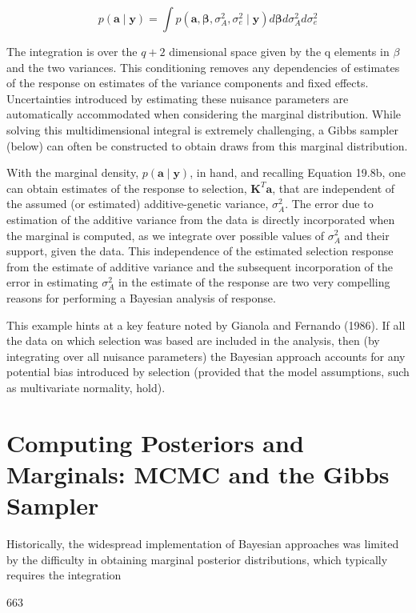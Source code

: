 \documentclass{article}
\begin{document}
\begin{equation}
p(\mathbf{a}\mid\mathbf{y})=\int p(\mathbf{a},\boldsymbol{\beta},\sigma_{A}^{2},\sigma_{e}^{2}\mid\mathbf{y})d\boldsymbol{\beta}d\sigma_{A}^{2}d\sigma_{e}^{2}
\end{equation}

The integration is over the  $ q + 2 $ dimensional space given by the q elements in  $ \beta $ and the two variances. This conditioning removes any dependencies of estimates of the response on estimates of the variance components and fixed effects. Uncertainties introduced by estimating these nuisance parameters are automatically accommodated when considering the marginal distribution. While solving this multidimensional integral is extremely challenging, a Gibbs sampler (below) can often be constructed to obtain draws from this marginal distribution.

With the marginal density,  $ p(\mathbf{a} \mid \mathbf{y}) $, in hand, and recalling Equation 19.8b, one can obtain estimates of the response to selection,  $ \mathbf{K}^T \mathbf{a} $, that are independent of the assumed (or estimated) additive-genetic variance,  $ \sigma_A^2 $. The error due to estimation of the additive variance from the data is directly incorporated when the marginal is computed, as we integrate over possible values of  $ \sigma_A^2 $ and their support, given the data. This independence of the estimated selection response from the estimate of additive variance and the subsequent incorporation of the error in estimating  $ \sigma_A^2 $ in the estimate of the response are two very compelling reasons for performing a Bayesian analysis of response.

This example hints at a key feature noted by Gianola and Fernando (1986). If all the data on which selection was based are included in the analysis, then (by integrating over all nuisance parameters) the Bayesian approach accounts for any potential bias introduced by selection (provided that the model assumptions, such as multivariate normality, hold).

\section{Computing Posteriors and Marginals: MCMC and the Gibbs Sampler}
Historically, the widespread implementation of Bayesian approaches was limited by the difficulty in obtaining marginal posterior distributions, which typically requires the integration

663
\end{document}
